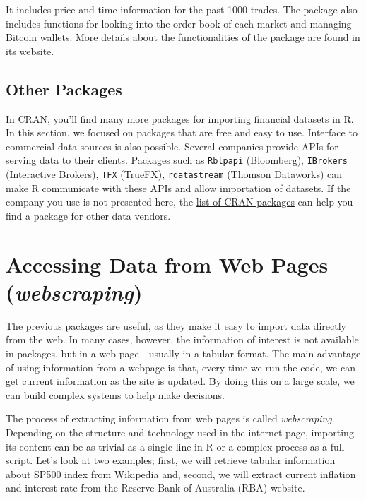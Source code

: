 \documentclass[11pt,]{book}
\begin{document}
It includes price and time information for the past 1000 trades. The
package also includes functions for looking into the order book of each
market and managing Bitcoin wallets. More details about the
functionalities of the package are found in its
\href{https://github.com/jangorecki/Rbitcoin}{website}.

\subsection{Other Packages}\label{other-packages}

In CRAN, you'll find many more packages for importing financial datasets
in R. In this section, we focused on packages that are free and easy to
use. Interface to commercial data sources is also possible. Several
companies provide APIs for serving data to their clients. Packages such
as \texttt{Rblpapi} (Bloomberg), \texttt{IBrokers} (Interactive
Brokers), \texttt{TFX} (TrueFX), \texttt{rdatastream} (Thomson
Dataworks) can make R communicate with these APIs and allow importation
of datasets. If the company you use is not presented here, the
\href{https://cran.r-project.org/}{list of CRAN packages} can help you
find a package for other data vendors.

\section{\texorpdfstring{Accessing Data from Web Pages
(\emph{webscraping})}{Accessing Data from Web Pages (webscraping)}}\label{accessing-data-from-web-pages-webscraping}

The previous packages are useful, as they make it easy to import data
directly from the web. In many cases, however, the information of
interest is not available in packages, but in a web page - usually in a
tabular format. The main advantage of using information from a webpage
is that, every time we run the code, we can get current information as
the site is updated. By doing this on a large scale, we can build
complex systems to help make decisions.

The process of extracting information from web pages is called
\emph{webscraping}. Depending on the structure and technology used in
the internet page, importing its content can be as trivial as a single
line in R or a complex process as a full script. Let's look at two
examples; first, we will retrieve tabular information about SP500 index
from Wikipedia and, second, we will extract current inflation and
interest rate from the Reserve Bank of Australia (RBA) website.
\end{document}
